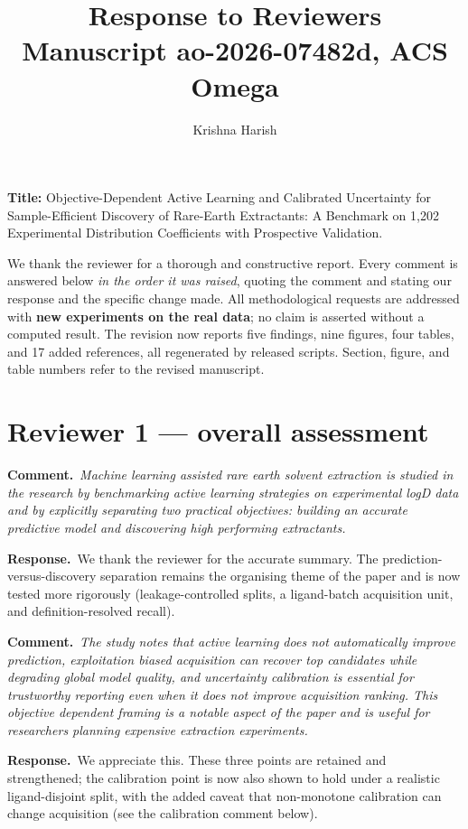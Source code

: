 \documentclass[11pt]{article}
\title{\vspace{-2em}Response to Reviewers\\\large Manuscript ao-2026-07482d, ACS Omega}
\author{Krishna Harish}
\date{}
\newcommand{\rev}[1]{\begingroup\itshape\color{gray}#1\endgroup}
\newcommand{\resp}{\par\noindent\textbf{Response.}\ }
\newcommand{\cmt}[1]{\par\vspace{4pt}\noindent\textbf{Comment.}\ \rev{#1}\par\vspace{2pt}}
\begin{document}
\maketitle
\vspace{-2em}

\noindent\textbf{Title:} Objective-Dependent Active Learning and Calibrated
Uncertainty for Sample-Efficient Discovery of Rare-Earth Extractants: A Benchmark on
1{,}202 Experimental Distribution Coefficients with Prospective Validation.

We thank the reviewer for a thorough and constructive report. Every comment is answered
below \emph{in the order it was raised}, quoting the comment and stating our response
and the specific change made. All methodological requests are addressed with
\textbf{new experiments on the real data}; no claim is asserted without a computed
result. The revision now reports five findings, nine figures, four tables, and 17 added
references, all regenerated by released scripts. Section, figure, and table numbers
refer to the revised manuscript.

\section*{Reviewer 1 --- overall assessment}

\cmt{Machine learning assisted rare earth solvent extraction is studied in the research
by benchmarking active learning strategies on experimental logD data and by explicitly
separating two practical objectives: building an accurate predictive model and
discovering high performing extractants.}
\resp We thank the reviewer for the accurate summary. The prediction-versus-discovery
separation remains the organising theme of the paper and is now tested more
rigorously (leakage-controlled splits, a ligand-batch acquisition unit, and
definition-resolved recall).

\cmt{The study notes that active learning does not automatically improve prediction,
exploitation biased acquisition can recover top candidates while degrading global model
quality, and uncertainty calibration is essential for trustworthy reporting even when
it does not improve acquisition ranking. This objective dependent framing is a notable
aspect of the paper and is useful for researchers planning expensive extraction
experiments.}
\resp We appreciate this. These three points are retained and strengthened; the
calibration point is now also shown to hold under a realistic ligand-disjoint split,
with the added caveat that non-monotone calibration can change acquisition (see the
calibration comment below).
\end{document}
